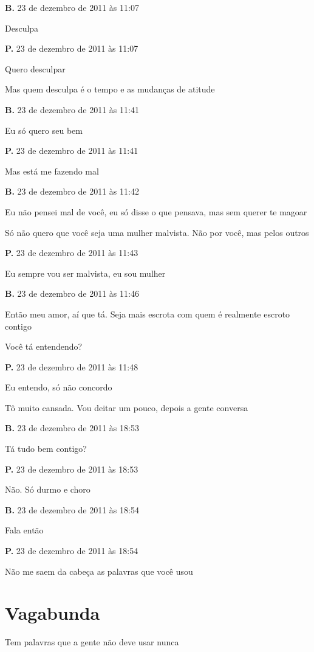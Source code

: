 {\parindent0pt\parskip1pt\raggedright
\textbf{B.} 23 de dezembro de 2011 às 11:07

Desculpa

\textbf{P.} 23 de dezembro de 2011 às 11:07

Quero desculpar

Mas quem desculpa é o tempo e as mudanças de atitude

\textbf{B.} 23 de dezembro de 2011 às 11:41

Eu só quero seu bem

\textbf{P.} 23 de dezembro de 2011 às 11:41

Mas está me fazendo mal

\textbf{B.} 23 de dezembro de 2011 às 11:42

Eu não pensei mal de você, eu só disse o que pensava, mas sem querer te
magoar

Só não quero que você seja uma mulher malvista. Não por você, mas pelos
outros

\textbf{P.} 23 de dezembro de 2011 às 11:43

Eu sempre vou ser malvista, eu sou mulher

\textbf{B.} 23 de dezembro de 2011 às 11:46

Então meu amor, aí que tá. Seja mais escrota com quem é realmente
escroto contigo

Você tá entendendo?

\textbf{P.} 23 de dezembro de 2011 às 11:48

Eu entendo, só não concordo

Tô muito cansada. Vou deitar um pouco, depois a gente conversa

\textbf{B.} 23 de dezembro de 2011 às 18:53

Tá tudo bem contigo?

\textbf{P.} 23 de dezembro de 2011 às 18:53

Não. Só durmo e choro

\textbf{B.} 23 de dezembro de 2011 às 18:54

Fala então

\textbf{P.} 23 de dezembro de 2011 às 18:54

Não me saem da cabeça as palavras que você usou
}

\chapter{Vagabunda}

Tem palavras que a gente não deve usar nunca

